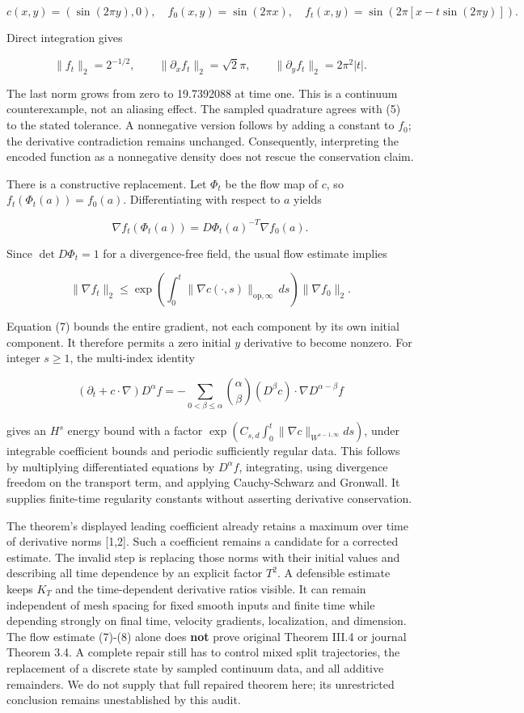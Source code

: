 \[
c(x,y)=(\sin(2\pi y),0),\quad f_0(x,y)=\sin(2\pi x),\quad
f_t(x,y)=\sin(2\pi[x-t\sin(2\pi y)]). \tag{4}
\]

Direct integration gives

\[
\|f_t\|_2=2^{-1/2},\qquad
\|\partial_x f_t\|_2=\sqrt2\pi,\qquad
\|\partial_y f_t\|_2=2\pi^2|t|. \tag{5}
\]

The last norm grows from zero to 19.7392088 at time one. This is a
continuum counterexample, not an aliasing effect. The sampled quadrature
agrees with (5) to the stated tolerance. A nonnegative version follows
by adding a constant to \(f_0\); the derivative contradiction remains
unchanged. Consequently, interpreting the encoded function as a
nonnegative density does not rescue the conservation claim.

There is a constructive replacement. Let \(\Phi_t\) be the flow map of
\(c\), so \(f_t(\Phi_t(a))=f_0(a)\). Differentiating with respect to
\(a\) yields

\[
\nabla f_t(\Phi_t(a))=D\Phi_t(a)^{-T}\nabla f_0(a). \tag{6}
\]

Since \(\det D\Phi_t=1\) for a divergence-free field, the usual flow
estimate implies

\[
\|\nabla f_t\|_2\leq
\exp\!\left(\int_0^t\|\nabla c(\cdot,s)\|_{\mathrm{op},\infty}\,ds\right)
\|\nabla f_0\|_2. \tag{7}
\]

Equation (7) bounds the entire gradient, not each component by its own
initial component. It therefore permits a zero initial \(y\) derivative
to become nonzero. For integer \(s\geq1\), the multi-index identity

\[
(\partial_t+c\cdot\nabla)D^\alpha f
=-\sum_{0<\beta\leq\alpha}{\alpha\choose\beta}
(D^\beta c)\cdot\nabla D^{\alpha-\beta}f \tag{8}
\]

gives an \(H^s\) energy bound with a factor
\(\exp(C_{s,d}\int_0^t\|\nabla c\|_{W^{s-1,\infty}}ds)\), under
integrable coefficient bounds and periodic sufficiently regular data.
This follows by multiplying differentiated equations by \(D^\alpha f\),
integrating, using divergence freedom on the transport term, and
applying Cauchy-Schwarz and Gronwall. It supplies finite-time regularity
constants without asserting derivative conservation.

The theorem's displayed leading coefficient already retains a maximum
over time of derivative norms {[}1,2{]}. Such a coefficient remains a
candidate for a corrected estimate. The invalid step is replacing those
norms with their initial values and describing all time dependence by an
explicit factor \(T^2\). A defensible estimate keeps \(K_T\) and the
time-dependent derivative ratios visible. It can remain independent of
mesh spacing for fixed smooth inputs and finite time while depending
strongly on final time, velocity gradients, localization, and dimension.
The flow estimate (7)-(8) alone does \textbf{not} prove original Theorem
III.4 or journal Theorem 3.4. A complete repair still has to control
mixed split trajectories, the replacement of a discrete state by sampled
continuum data, and all additive remainders. We do not supply that full
repaired theorem here; its unrestricted conclusion remains unestablished
by this audit.

